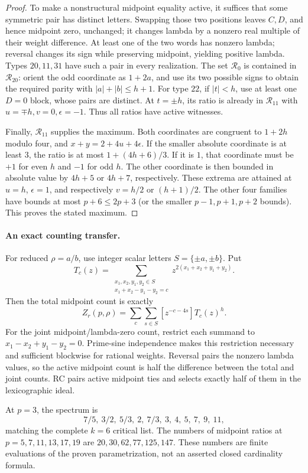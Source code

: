\begin{proof}
To make a nonstructural midpoint equality active, it suffices that some symmetric pair has distinct letters. Swapping those two positions leaves $C,D$, and hence midpoint zero, unchanged; it changes lambda by a nonzero real multiple of their weight difference. At least one of the two words has nonzero lambda; reversal changes its sign while preserving midpoint, yielding positive lambda. Types $20,11,31$ have such a pair in every realization. The set $\mathcal R_0$ is contained in $\mathcal R_{20}$: orient the odd coordinate as $1+2a$, and use its two possible signs to obtain the required parity with $|a|+|b|\le h+1$. For type $22$, if $|t|<h$, use at least one $D=0$ block, whose pairs are distinct. At $t=\pm h$, its ratio is already in $\mathcal R_{11}$ with $u=\mp h,v=0,\epsilon=-1$. Thus all ratios have active witnesses.

Finally, $\mathcal R_{11}$ supplies the maximum. Both coordinates are congruent to $1+2h$ modulo four, and $x+y=2+4u+4\epsilon$. If the smaller absolute coordinate is at least $3$, the ratio is at most $1+(4h+6)/3$. If it is $1$, that coordinate must be $+1$ for even $h$ and $-1$ for odd $h$. The other coordinate is then bounded in absolute value by $4h+5$ or $4h+7$, respectively. These extrema are attained at $u=h$, $\epsilon=1$, and respectively $v=h/2$ or $(h+1)/2$. The other four families have bounds at most $p+6\le2p+3$ (or the smaller $p-1,p+1,p+2$ bounds). This proves the stated maximum.
\end{proof}

\paragraph{An exact counting transfer.}
For reduced $\rho=a/b$, use integer scalar letters $S=\{\pm a,\pm b\}$. Put
\[
T_c(z)=\sum_{\substack{x_1,x_2,y_1,y_2\in S\\x_1+x_2-y_1-y_2=c}}
 z^{2(x_1+x_2+y_1+y_2)}.
\]
Then the total midpoint count is exactly
\[
Z_r(p,\rho)=\sum_c\sum_{s\in S}[z^{-c-4s}]T_c(z)^h.                 \tag{T}
\]
For the joint midpoint/lambda-zero count, restrict each summand to
$x_1-x_2+y_1-y_2=0$. Prime-sine independence makes this restriction necessary and sufficient blockwise for rational weights. Reversal pairs the nonzero lambda values, so the active midpoint count is half the difference between the total and joint counts. RC pairs active midpoint ties and selects exactly half of them in the lexicographic ideal.

At $p=3$, the spectrum is
\[
7/5,\ 3/2,\ 5/3,\ 2,\ 7/3,\ 3,\ 4,\ 5,\ 7,\ 9,\ 11,
\]
matching the complete $k=6$ critical list. The numbers of midpoint ratios at $p=5,7,11,13,17,19$ are $20,30,62,77,125,147$. These numbers are finite evaluations of the proven parametrization, not an asserted closed cardinality formula.

